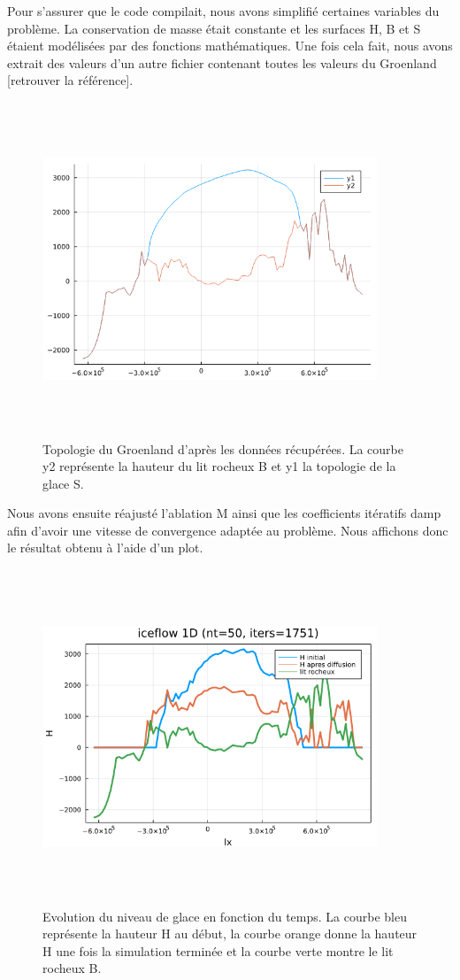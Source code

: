 \documentclass{article}
\begin{document}
Pour s'assurer que le code compilait, nous avons simplifié certaines variables du problème. La conservation de masse était constante et les surfaces H, B et S  étaient modélisées par des fonctions mathématiques. Une fois cela fait, nous avons extrait des valeurs d'un autre fichier contenant toutes les valeurs du Groenland [retrouver la référence].
\begin{figure}[!htpb]
\centering
\includegraphics[width=10cm, keepaspectratio=true, height=10cm]{Groenland.png}
\caption{Topologie du Groenland d'après les données récupérées. La courbe y2 représente la hauteur du lit rocheux B et y1 la topologie de la glace S. }

\end{figure}
\newpage
Nous avons ensuite réajusté l'ablation M ainsi que les coefficients itératifs damp afin d'avoir une vitesse de convergence adaptée au problème.
Nous affichons donc le résultat obtenu à l'aide d'un plot.
\begin{figure}[!htpb]
\centering
\includegraphics[width=10cm, keepaspectratio=true, height=10cm]{Iceflow1D.png}
\caption{Evolution du niveau de glace en fonction du temps. La courbe bleu représente la hauteur H au début, la courbe orange donne la hauteur H une fois la simulation terminée et la courbe verte montre le lit rocheux B.}

\end{figure}
\end{document}

